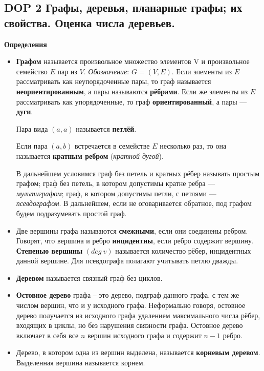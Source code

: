\subsection{DOP 2 Графы,  деревья,  планарные графы;  их свойства.  Оценка числа деревьев.}

\textbf{Определения}
\begin{itemize}
\item \textbf{Графом} называется произвольное множество элементов V и произвольное семейство $E$ пар из $V$. \textit{Обозначение}: $G = (V, E)$.
Если элементы из $E$ рассматривать как неупорядоченные пары, то граф называется \textbf{неориентированным}, а пары называются \textbf{рёбрами}. 
Если же элементы из $E$ рассматривать как упорядоченные, то граф \textbf{ориентированный}, а пары --- \textbf{дуги}.

Пара вида $(a, a)$ называется \textbf{петлёй}.

Если пара $(a, b)$ встречается в семействе $E$ несколько раз, то она называется \textbf{кратным ребром} (\textit{кратной дугой}).


В дальнейшем условимся граф без петель и кратных рёбер называть простым графом; граф без петель, в котором допустимы кратне ребра --- \textit{мультиграфом}; граф, в котором допустимы петли, с петлями --- \textit{псевдографом}. В дальнейшем, если не оговаривается обратное, под графом будем подразумевать простой граф.

\item Две вершины графа называются \textbf{смежными}, если они соединены ребром. Говорят, что вершина и ребро \textbf{инцидентны}, если ребро содержит вершину. \textbf{Степенью вершины} $(deg~v)$ называется количество рёбер, инцидентных данной вершине. Для псевдографа полагают учитывать петлю дважды.

\item \textbf{Деревом} называется связный граф без циклов. %

\item \textbf{Остовное дерево} графа -- это дерево, подграф данного графа, с тем же числом вершин, что и у исходного графа. Неформально говоря, остовное дерево получается из исходного графа удалением максимального числа рёбер, входящих в циклы, но без нарушения связности графа. Остовное дерево включает в себя все $n$ вершин исходного графа и содержит $n-1$ ребро.


\item  Дерево, в котором одна из вершин выделена, называется \textbf{корневым деревом}. Выделенная вершина называется корнем.


\end{itemize}
